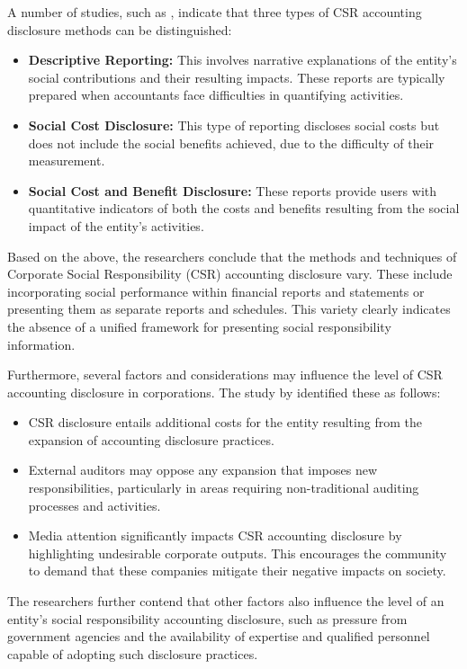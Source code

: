 \documentclass[10pt]{NSP1}
\begin{document}
	A number of studies, such as \cite{Tarshi2017}, indicate that three types of CSR accounting disclosure methods can be distinguished:
	\begin{itemize}
		\item \textbf{Descriptive Reporting:} This involves narrative explanations of the entity's social contributions and their resulting impacts. These reports are typically prepared when accountants face difficulties in quantifying activities.
		\item \textbf{Social Cost Disclosure:} This type of reporting discloses social costs but does not include the social benefits achieved, due to the difficulty of their measurement.
		\item \textbf{Social Cost and Benefit Disclosure:} These reports provide users with quantitative indicators of both the costs and benefits resulting from the social impact of the entity's activities.
	\end{itemize}
	
	Based on the above, the researchers conclude that the methods and techniques of Corporate Social Responsibility (CSR) accounting disclosure vary. These include incorporating social performance within financial reports and statements or presenting them as separate reports and schedules. This variety clearly indicates the absence of a unified framework for presenting social responsibility information.
	
	Furthermore, several factors and considerations may influence the level of CSR accounting disclosure in corporations. The study by \cite{Oniza2013} identified these as follows:
	\begin{itemize}
		\item CSR disclosure entails additional costs for the entity resulting from the expansion of accounting disclosure practices.
		\item External auditors may oppose any expansion that imposes new responsibilities, particularly in areas requiring non-traditional auditing processes and activities.
		\item Media attention significantly impacts CSR accounting disclosure by highlighting undesirable corporate outputs. This encourages the community to demand that these companies mitigate their negative impacts on society.
	\end{itemize}
	
	The researchers further contend that other factors also influence the level of an entity's social responsibility accounting disclosure, such as pressure from government agencies and the availability of expertise and qualified personnel capable of adopting such disclosure practices.
	
\end{document}
